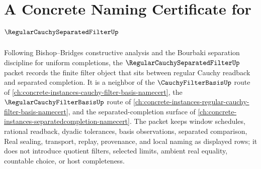 \chapter{A Concrete Naming Certificate for $\RegularCauchySeparatedFilterUp$}
\label{ch:concrete-instances-regular-cauchy-separated-filter-namecert}

Following Bishop--Bridges constructive analysis and the Bourbaki separation discipline for uniform completions, the $\RegularCauchySeparatedFilterUp$ packet records the finite filter object that sits between regular Cauchy readback and separated completion. It is a neighbor of the $\CauchyFilterBasisUp$ route of \autoref{ch:concrete-instances-cauchy-filter-basis-namecert}, the $\RegularCauchyFilterBasisUp$ route of \autoref{ch:concrete-instances-regular-cauchy-filter-basis-namecert}, and the separated-completion surface of \autoref{ch:concrete-instances-separatedcompletion-namecert}. The packet keeps window schedules, rational readback, dyadic tolerances, basis observations, separated comparison, Real sealing, transport, replay, provenance, and local naming as displayed rows; it does not introduce quotient filters, selected limits, ambient real equality, countable choice, or host completeness.

